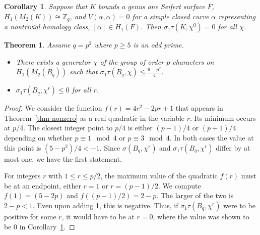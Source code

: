 \documentclass[10pt,a4paper]{amsart}
\newtheorem{theorem}{Theorem}
\newtheorem{corollary}{Corollary}
\def\Z{{\mathbb Z}}
\begin{document}
\begin{corollary} \label{cor-zero} Suppose that $K$ bounds a genus one Seifert surface $F$,  $H_1(M_2(K)) \cong \Z_q$, and $V(\alpha, \alpha) = 0 $ for a simple closed curve  $\alpha $ representing a nontrivial homology class, $[\alpha] \in H_1(F)$.  Then $\sigma_1 \tau (K, \chi^0 ) =   0$ for all $\chi$.
\end{corollary}

\begin{theorem}\label{thm-boundscg} Assume $q = p^2$ where $p \ge 5$ is an odd   prime. %
\begin{itemize}

\item There exists a  generator  $\chi$ of the group of order $p$ characters on $H_1(M_2(B_q))$   such that $\sigma_1 \tau(B_q, \chi) \le   \frac{9 - p^2}{4}$.
\item  $\sigma_1 \tau (B_q,  \chi^r) \le 0 $ for all $r$.
\end{itemize}
\end{theorem}

\begin{proof}  We consider the function   $f(r)  = 4r^2 - 2pr +1$ that appears in Theorem~\ref{thm-nonzero}  as a real quadratic in the variable $r$.
Its minimum occurs at $p/4$.
The closest integer point to $p/4$ is either $(p-1)/4$ or $(p+1)/4 $ depending on whether $p \equiv 1 \mod 4$ or $  p \equiv  3 \mod4$.   In both cases the value at this  point is $(5 - p^2)/4 < -1$.  Since $\sigma(B_q, \chi^r)$ and $\sigma_1\tau(B_q, \chi^r)$ differ by at most one, we have the first statement.

For integers $r$ with  $ 1 \le r \le p/2$, the maximum value of the quadratic $f(r)$ must be at an endpoint, either $r=1$ or $r = (p-1)/2$.  We compute $f(1) = (5 - 2p)$ and $f((p-1)/2) = 2 - p$. The larger of the two is $2 -p <1$.  Even upon adding 1, this is negative.  Thus, if $\sigma_1 \tau(B_q, \chi^r)$ were to be positive for some $r$, it would have to be at $r = 0$, where the value was shown to be 0 in Corollary~\ref{cor-zero}.

\end{proof}
\end{document}
